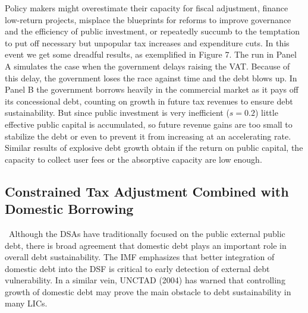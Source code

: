 \documentclass[11pt]{article}
\begin{document}

Policy makers might overestimate their capacity for fiscal adjustment,
finance low-return projects, misplace the blueprints for reforms to improve
governance and the efficiency of public investment, or repeatedly succumb to
the temptation to put off necessary but unpopular tax increases and
expenditure cuts. In this event we get some dreadful results, as exemplified
in Figure 7. The run in Panel A simulates the case when the government
delays raising the VAT. Because of this delay, the government loses the race
against time and the debt blows up. In Panel B the government borrows
heavily in the commercial market as it pays off its concessional debt,
counting on growth in future tax revenues to ensure debt sustainability. But
since public investment is very inefficient ($s=0.2$) little effective
public capital is accumulated, so future revenue gains are too small to
stabilize the debt or even to prevent it from increasing at an accelerating
rate. Similar results of explosive debt growth obtain if the return on
public capital, the capacity to collect user fees or the absorptive capacity
are low enough.

\subsection{Constrained Tax Adjustment Combined with Domestic Borrowing}

\quad\ \thinspace Although the DSAs have traditionally focused on the public
external public debt, there is broad agreement that domestic debt plays an
important role in overall debt sustainability. The IMF emphasizes that
better integration of domestic debt into the DSF is critical to early
detection of external debt vulnerability. In a similar vein, UNCTAD (2004)
has warned that controlling growth of domestic debt may prove the main
obstacle to debt sustainability in many LICs.
\end{document}
